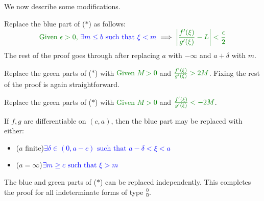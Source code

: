We now describe some modifications.
\begin{description}\itemsep1pt
	\item[\normalfont\emph{If $a=-\infty$}:] Replace the blue part of ($\ast$) as follows:
	\[\textcolor{Green}{\text{Given $\epsilon>0$, }} \textcolor{blue}{\exists m\le b\text{ such that }\xi<m}\implies \textcolor{Green}{\smash[t]{\nm{\frac{f'(\xi)}{g'(\xi)}-L}<\frac\epsilon 2}}\]
	The rest of the proof goes through after replacing $a$ with $-\infty$ and $a+\delta$ with $m$.
	\item[\normalfont\emph{If $L=\infty$}:] Replace the green parts of ($\ast$) with \textcolor{Green}{Given $M>0$} and $\textcolor{Green}{\frac{f'(\xi)}{g'(\xi)}>2M}$. Fixing the rest of the proof is again straightforward.
	\item[\normalfont\emph{If $L=-\infty$}:] Replace the green parts of ($\ast$) with \textcolor{Green}{Given $M>0$} and $\textcolor{Green}{\frac{f'(\xi)}{g'(\xi)}<-2M}$.
	\item[\normalfont\emph{Left-limits}:] If $f,g$ are differentiable on $(c,a)$, then the blue part may be replaced with either:
	\begin{itemize}
	  \item ($a$ finite)\quad\textcolor{blue}{$\exists\delta\in(0,a-c)\text{ such that }a-\delta<\xi<a$}
	  \item ($a=\infty$)\quad $\textcolor{blue}{\exists m\ge c\text{ such that }\xi>m}$
	\end{itemize} 
\end{description}
The blue and green parts of ($\ast$) can be replaced independently. This completes the proof for all indeterminate forms of type $\frac 00$.

